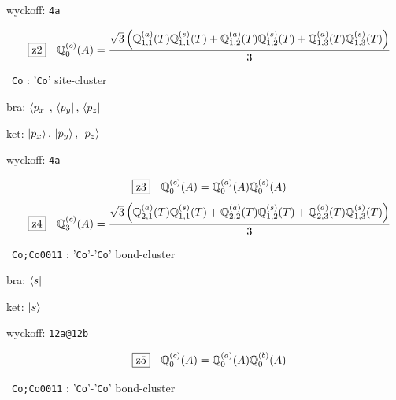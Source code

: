 \documentclass[fleqn,10pt,landscape]{jsarticle}
\begin{document}
\noindent\quad * wyckoff: \texttt{4a}

\begin{dmath*}
\hspace*{3mm}\fbox{z2}\quad \mathbb{Q}_{0}^{(c)}(A)=\frac{\sqrt{3} \left(\mathbb{Q}_{1,1}^{(a)}(T) \mathbb{Q}_{1,1}^{(s)}(T) + \mathbb{Q}_{1,2}^{(a)}(T) \mathbb{Q}_{1,2}^{(s)}(T) + \mathbb{Q}_{1,3}^{(a)}(T) \mathbb{Q}_{1,3}^{(s)}(T)\right)}{3}
\end{dmath*}
\vspace{5mm}

\noindent\textbullet\, \texttt{Co} : '\texttt{Co}' site-cluster

\noindent\quad * bra: $\bra{p_{x}},\, \bra{p_{y}},\, \bra{p_{z}}$

\noindent\quad * ket: $\ket{p_{x}},\, \ket{p_{y}},\, \ket{p_{z}}$

\noindent\quad * wyckoff: \texttt{4a}

\begin{dmath*}
\hspace*{3mm}\fbox{z3}\quad \mathbb{Q}_{0}^{(c)}(A)=\mathbb{Q}_{0}^{(a)}(A) \mathbb{Q}_{0}^{(s)}(A)
\end{dmath*}
\begin{dmath*}
\hspace*{3mm}\fbox{z4}\quad \mathbb{Q}_{3}^{(c)}(A)=\frac{\sqrt{3} \left(\mathbb{Q}_{2,1}^{(a)}(T) \mathbb{Q}_{1,1}^{(s)}(T) + \mathbb{Q}_{2,2}^{(a)}(T) \mathbb{Q}_{1,2}^{(s)}(T) + \mathbb{Q}_{2,3}^{(a)}(T) \mathbb{Q}_{1,3}^{(s)}(T)\right)}{3}
\end{dmath*}
\vspace{5mm}

\noindent\textbullet\, \texttt{Co;Co\texttt{}001\texttt{}1} : '\texttt{Co}'-'\texttt{Co}' bond-cluster

\noindent\quad * bra: $\bra{s}$

\noindent\quad * ket: $\ket{s}$

\noindent\quad * wyckoff: \texttt{12a@12b}

\begin{dmath*}
\hspace*{3mm}\fbox{z5}\quad \mathbb{Q}_{0}^{(c)}(A)=\mathbb{Q}_{0}^{(a)}(A) \mathbb{Q}_{0}^{(b)}(A)
\end{dmath*}
\vspace{5mm}

\noindent\textbullet\, \texttt{Co;Co\texttt{}001\texttt{}1} : '\texttt{Co}'-'\texttt{Co}' bond-cluster
\end{document}

